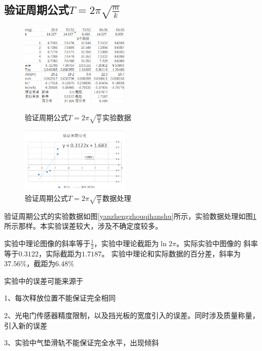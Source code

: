\documentclass{ctexart}
\begin{document}
  \subsection{验证周期公式$T=2\pi \sqrt{\frac{m}{k}}$}
  \begin{figure}[b]
    \centering
    \begin{minipage}[b]{0.48\textwidth}
      \centering
      \includegraphics[width=0.46\textwidth]{yanzhengzhouqihanshu.png}
      \caption{验证周期公式$T=2\pi \sqrt{\frac{m}{k}}$实验数据}\label{yanzhengzhouqihanshu}
    \end{minipage}
    \begin{minipage}[b]{0.48\textwidth}
      \centering
      \includegraphics[width=0.46\textwidth]{yanzhengzhouqihanshuzuotu.png}
      \caption{验证周期公式$T=2\pi \sqrt{\frac{m}{k}}$数据处理}\label{yanzhengzhouqigongshizuotu}
    \end{minipage}
  \end{figure}
  验证周期公式的实验数据如图\ref{yanzhengzhouqihanshu}所示，实验数据处理如图\ref{yanzhengzhouqigongshizuotu}
  所示那样。本实验误差较大，涉及不确定度较多。
  
  实验中理论图像的斜率等于$\frac{1}{2}$，实验中理论截距为$\ln{2\pi}$。实际实验中图像的
  斜率等于$0.3122$，实际截距为$1.7187$。
  实验中理论和实际数据的百分差，斜率为$37.56\%$，截距为$6.48\%$

  实验中的误差可能来源于 
  
  1、每次释放位置不能保证完全相同

  2、光电门传感器精度限制，以及挡光板的宽度引入的误差。同时涉及质量称量，引入新的误差

  3、实验中气垫滑轨不能保证完全水平，出现倾斜
\end{document}
